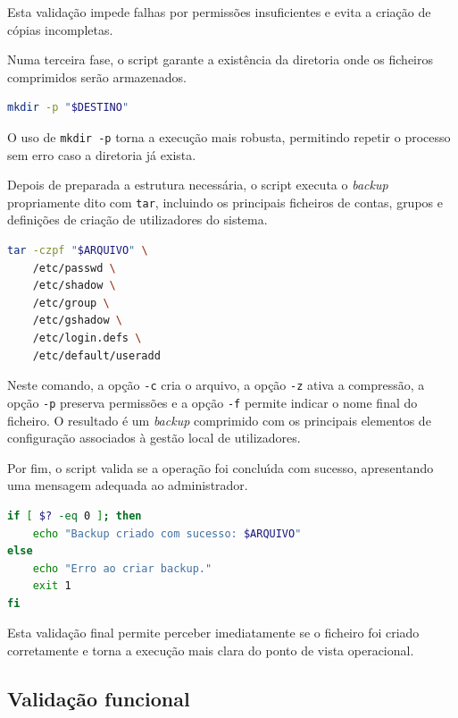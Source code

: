 Esta valida\c{c}\~ao impede falhas por permiss\~oes insuficientes e evita a cria\c{c}\~ao de c\'opias incompletas.

Numa terceira fase, o script garante a exist\^encia da diretoria onde os ficheiros comprimidos ser\~ao armazenados.

\begin{lstlisting}[language=bash,caption={Criacao da diretoria de destino}]
mkdir -p "$DESTINO"
\end{lstlisting}

O uso de \texttt{mkdir -p} torna a execu\c{c}\~ao mais robusta, permitindo repetir o processo sem erro caso a diretoria j\'a exista.

Depois de preparada a estrutura necess\'aria, o script executa o \textit{backup} propriamente dito com \texttt{tar}, incluindo os principais ficheiros de contas, grupos e defini\c{c}\~oes de cria\c{c}\~ao de utilizadores do sistema.

\begin{lstlisting}[language=bash,caption={Backup de ficheiros criticos com tar}]
tar -czpf "$ARQUIVO" \
    /etc/passwd \
    /etc/shadow \
    /etc/group \
    /etc/gshadow \
    /etc/login.defs \
    /etc/default/useradd
\end{lstlisting}

Neste comando, a op\c{c}\~ao \texttt{-c} cria o arquivo, a op\c{c}\~ao \texttt{-z} ativa a compress\~ao, a op\c{c}\~ao \texttt{-p} preserva permiss\~oes e a op\c{c}\~ao \texttt{-f} permite indicar o nome final do ficheiro. O resultado \'{e} um \textit{backup} comprimido com os principais elementos de configura\c{c}\~ao associados \`a gest\~ao local de utilizadores.

Por fim, o script valida se a opera\c{c}\~ao foi conclu\'{\i}da com sucesso, apresentando uma mensagem adequada ao administrador.

\begin{lstlisting}[language=bash,caption={Validacao do resultado do backup}]
if [ $? -eq 0 ]; then
    echo "Backup criado com sucesso: $ARQUIVO"
else
    echo "Erro ao criar backup."
    exit 1
fi
\end{lstlisting}

Esta valida\c{c}\~ao final permite perceber imediatamente se o ficheiro foi criado corretamente e torna a execu\c{c}\~ao mais clara do ponto de vista operacional.

\subsection{Valida\c{c}\~ao funcional}


